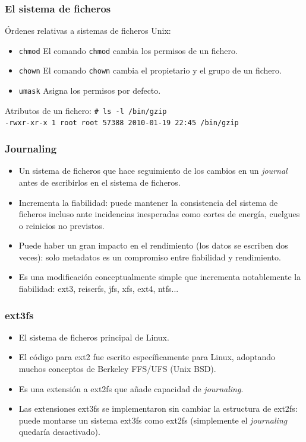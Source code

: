 \documentclass{beamer}
\begin{document}
\begin{frame}
  \frametitle{El sistema de ficheros}

Órdenes relativas a sistemas de ficheros Unix:

  \begin{itemize}
    \item \alert{\texttt{chmod}} El comando \texttt{chmod} cambia los permisos de un fichero.
    \item \alert{\texttt{chown}} El comando \texttt{chown} cambia el propietario y el grupo de un fichero.
    \item \alert{\texttt{umask}} Asigna los permisos por defecto.
  \end{itemize}



\begin{block}{Atributos de un fichero:}
\small
  \texttt{\# ls -l /bin/gzip} \\ 
  \texttt{-rwxr-xr-x 1 root root 57388 2010-01-19 22:45 /bin/gzip}
\end{block}

\normalsize
\end{frame}


\begin{frame}
  \frametitle{Journaling}
  \begin{itemize}
    \item Un sistema de ficheros que hace seguimiento de los cambios en un \textit{journal} antes de escribirlos en el sistema de ficheros.
    \item Incrementa la fiabilidad: puede mantener la consistencia del sistema de ficheros incluso ante incidencias inesperadas como cortes de energía, cuelgues o reinicios no previstos.
    \item Puede haber un gran impacto en el rendimiento (los datos se escriben dos veces): solo metadatos es un compromiso entre fiabilidad y rendimiento.
    \item Es una modificación conceptualmente simple que incrementa notablemente la fiabilidad: ext3, reiserfs, jfs, xfs, ext4, ntfs... 
  \end{itemize}
\end{frame}


\begin{frame}
  \frametitle{ext3fs}
  \begin{itemize}
    \item El sistema de ficheros principal de Linux.
    \item El código para ext2 fue escrito específicamente para Linux, adoptando muchos conceptos de Berkeley FFS/UFS (Unix BSD).
    \item Es una extensión a ext2fs que añade capacidad de \textit{journaling}.
    \item Las extensiones ext3fs se implementaron sin cambiar la estructura de ext2fs: puede montarse un sistema ext3fs como ext2fs (simplemente el \textit{journaling} quedaría desactivado).
  \end{itemize}
\end{frame}
\end{document}
